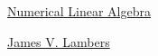\documentclass[11pt]{article}
\begin{document}
	\kaishu 
	\setcounter{section}{0}
	\begin{center}
		{\LARGE  \href{https://kss-methods.web.app/jvl/mat610/spr21/}{Numerical Linear Algebra}}
		
		
		{\large \href{https://kss-methods.web.app/jvl/}{James V. Lambers}}
	\end{center}
\setcounter{page}{1}

\end{document}
